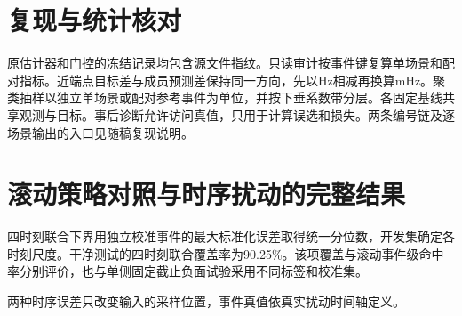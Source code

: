 \documentclass[UTF8,a4paper,11pt]{ctexart}
\begin{document}
\section{复现与统计核对}
原估计器和门控的冻结记录均包含源文件指纹。只读审计按事件键复算单场景和配对指标。近端点目标差与成员预测差保持同一方向，先以Hz相减再换算mHz。聚类抽样以独立单场景或配对参考事件为单位，并按下垂系数带分层。各固定基线共享观测与目标。事后诊断允许访问真值，只用于计算误选和损失。两条编号链及逐场景输出的入口见随稿复现说明。

\clearpage
\section{滚动策略对照与时序扰动的完整结果}
四时刻联合下界用独立校准事件的最大标准化误差取得统一分位数，开发集确定各时刻尺度。干净测试的四时刻联合覆盖率为90.25\%。该项覆盖与滚动事件级命中率分别评价，也与单侧固定截止负面试验采用不同标签和校准集。

两种时序误差只改变输入的采样位置，事件真值依真实扰动时间轴定义。
\end{document}
